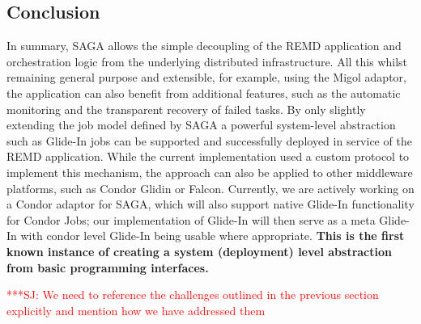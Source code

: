 \documentclass{rspublic}
\newcommand{\jhanote}[1]{ {\textcolor{red} { ***SJ: #1 }}}
\newcommand{\jhanote}[1]{}
\newcommand{\glidein}[1]{Glide-In }
\begin{document}
               
\subsection{Conclusion}
In summary, SAGA allows the simple decoupling of the REMD application
and orchestration logic from the underlying distributed
infrastructure. All this whilst remaining general purpose and
extensible, for example, using the Migol adaptor, the application can
also benefit from additional features, such as the automatic
monitoring and the transparent recovery of failed tasks. By only
slightly extending the job model defined by SAGA a powerful
system-level abstraction such as \glidein\ jobs can be supported
and successfully deployed in service of the REMD application. While
the current implementation used a custom protocol to implement this
mechanism, the approach can also be applied to other middleware
platforms, such as Condor Glidin or Falcon. Currently, we are actively
working on a Condor adaptor for SAGA, which will also support native
\glidein\ functionality for Condor Jobs; our implementation of
\glidein\ will then serve as a meta \glidein\, with condor level
\glidein\ being usable where appropriate.
{\bf This is the first known instance of creating a system
  (deployment) level abstraction from basic programming interfaces.}



\jhanote{We need to reference the challenges outlined in the previous
  section explicitly and mention how we have addressed them}
\end{document}
